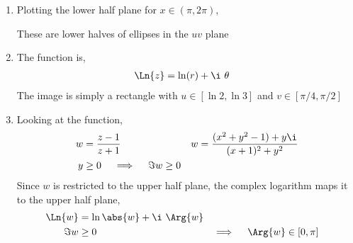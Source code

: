 \begin{enumerate}
    \item Plotting the lower half plane for $ x \in (\pi, 2\pi) $,
          \begin{figure}[H]
              \centering
          \end{figure}
          These are lower halves of ellipses in the $ uv $ plane

    \item The function is,
          \begin{align}
              \Ln{z} & = \ln(r) + \i\ \theta
          \end{align}
          The image is simply a rectangle with $ u \in [\ln 2, \ln 3] $ and
          $ v \in [\pi/4, \pi/2] $

    \item Looking at the function,
          \begin{align}
              w & = \frac{z-1}{z+1}                              &
              w & = \frac{(x^2 + y^2 - 1) + y\i }{(x+1)^2 + y^2}   \\
              y & \geq 0 \quad \implies \quad \Im{w} \geq 0
          \end{align}
          Since $ w $ is restricted to the upper half plane, the complex logarithm
          maps it to the upper half plane,
          \begin{align}
              \Ln{w}                 & = \ln\abs{w} + \i\ \Arg{w}   \\
              \Im{w}                 & \geq 0                     &
              \implies \quad \Arg{w} & \in [0, \pi]
          \end{align}
\end{enumerate}